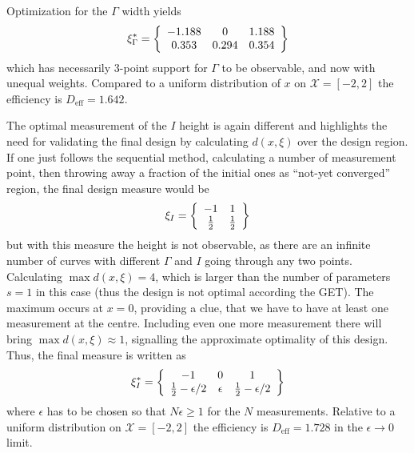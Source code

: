 \documentclass[12pt]{iopart}
\begin{document}
Optimization for the $\Gamma$ width yields
\begin{equation}
\xi^*_{\Gamma} = \left\{
  \begin{array}{c c c}
    -1.188 & 0 &  1.188 \\
    0.353 & 0.294 & 0.354\\
  \end{array} \right \}
\end{equation}
which has necessarily 3-point support for $\Gamma$ to be observable, and now with unequal weights. Compared to a uniform distribution of $x$ on $\mathcal{X} = [-2,2]$ the efficiency is $D_\mathrm{eff} = 1.642$.


The optimal measurement of the $I$ height is again different and highlights the need for validating the final design by calculating $d(x, \xi)$ over the design region. If one just follows the sequential method, calculating a number of measurement point, then throwing away a fraction of the initial ones as ``not-yet converged'' region, the final design measure would be
\begin{equation}
\xi_{I} = \left\{
  \begin{array}{c c}
    -1 &  1 \\
    \frac{1}{2} & \frac{1}{2}\\
  \end{array} \right \}
\end{equation}
but with this measure the height is not observable, as there are an infinite number of curves with different $\Gamma$ and $I$ going through any two points. Calculating $\max d(x, \xi) = 4$, which is larger than the number of parameters $s = 1$ in this case (thus the design is not optimal according the GET). The maximum occurs at $x = 0$, providing a clue, that we have to have at least one measurement at the centre. Including even one more measurement there will bring $\max d(x, \xi) \approx 1$, signalling the approximate optimality of this design. Thus, the final measure is written as
\begin{equation}
\xi^*_{I} = \left\{
  \begin{array}{c c c}
    -1 & 0 &  1 \\
    \frac{1}{2}-\epsilon/2 & \epsilon & \frac{1}{2}-\epsilon/2\\
  \end{array} \right \}
\end{equation}
where $\epsilon$ has to be chosen so that $N \epsilon \geq 1$ for the $N$ measurements. Relative to a uniform distribution on $\mathcal{X} = [-2,2]$ the efficiency is $D_\mathrm{eff} = 1.728$ in the $\epsilon \rightarrow 0$ limit.
\end{document}
